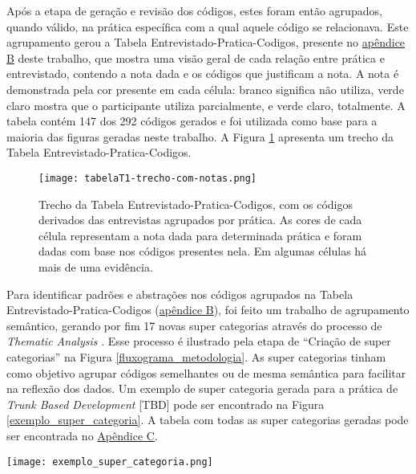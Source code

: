 Após a etapa de geração e revisão dos códigos, estes foram então agrupados, quando válido, na prática específica com a qual aquele código se relacionava. Este agrupamento gerou a Tabela Entrevistado-Pratica-Codigos, presente no \hyperlink{tabela1}{apêndice B} deste trabalho, que mostra uma visão geral de cada relação entre prática e entrevistado, contendo a nota dada e os códigos que justificam a nota. A nota é demonstrada pela cor presente em cada célula: branco significa não utiliza, verde claro mostra que o participante utiliza parcialmente, e verde claro, totalmente. A tabela contém 147 dos 292 códigos gerados e foi utilizada como base para a maioria das figuras geradas neste trabalho. A Figura \ref{trecho_tabela_t1} apresenta um trecho da Tabela Entrevistado-Pratica-Codigos.

\begin{figure}[ht]
    \begin{center}
    \texttt{[image: tabelaT1-trecho-com-notas.png]}
    \end{center}
    \caption[Trecho da Tabela Entrevistado-Pratica-Codigos]{
        Trecho da Tabela Entrevistado-Pratica-Codigos, com os códigos derivados das entrevistas agrupados por prática. As cores de cada célula representam a nota dada para determinada prática e foram dadas com base nos códigos presentes nela. Em algumas células há mais de uma evidência.
}\label{trecho_tabela_t1}
\end{figure}

Para identificar padrões e abstrações nos códigos agrupados na Tabela Entrevistado-Pratica-Codigos (\hyperlink{tabela1}{apêndice B}), foi feito um trabalho de agrupamento semântico, gerando por fim 17 novas super categorias através do processo de \emph{Thematic Analysis} \cite{groundedTheory}. Esse processo é ilustrado pela etapa de ``Criação de super categorias'' na Figura \ref{fluxograma_metodologia}. As super categorias tinham como objetivo agrupar códigos semelhantes ou de mesma semântica para facilitar na reflexão dos dados. Um exemplo de super categoria gerada para a prática de \emph{Trunk Based Development} [TBD] pode ser encontrado na Figura \ref{exemplo_super_categoria}. A tabela com todas as super categorias geradas pode ser encontrada no \hyperlink{super_Categorias}{Apêndice C}.

\begin{figure*}[ht]
\begin{center}
\texttt{[image: exemplo\_super\_categoria.png]}
\end{center}
\caption[Exemplo de super categoria]{
    Exemplo de super categoria gerada durante o processo de \emph{Thematic Analysis}.
}\label{exemplo_super_categoria}
\end{figure*}

